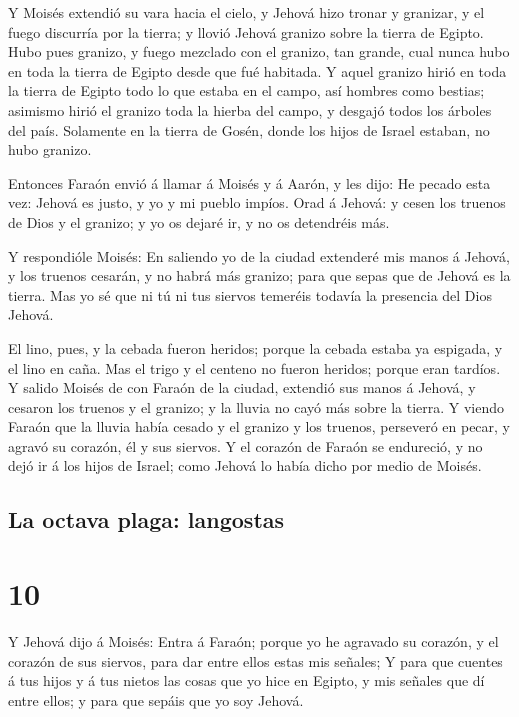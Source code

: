  Y Moisés extendió su vara hacia el cielo, y Jehová hizo
tronar y granizar, y el fuego discurría por la tierra; y llovió Jehová
granizo sobre la tierra de Egipto.  Hubo pues granizo, y
fuego mezclado con el granizo, tan grande, cual nunca hubo en toda la
tierra de Egipto desde que fué habitada.  Y aquel granizo
hirió en toda la tierra de Egipto todo lo que estaba en el campo, así
hombres como bestias; asimismo hirió el granizo toda la hierba del
campo, y desgajó todos los árboles del país.  Solamente
en la tierra de Gosén, donde los hijos de Israel estaban, no hubo
granizo.

 Entonces Faraón envió á llamar á Moisés y á Aarón, y les
dijo: He pecado esta vez: Jehová es justo, y yo y mi pueblo impíos.
 Orad á Jehová: y cesen los truenos de Dios y el granizo;
y yo os dejaré ir, y no os detendréis más.

 Y respondióle Moisés: En saliendo yo de la ciudad
extenderé mis manos á Jehová, y los truenos cesarán, y no habrá más
granizo; para que sepas que de Jehová es la tierra.  Mas
yo sé que ni tú ni tus siervos temeréis todavía la presencia del Dios
Jehová.

 El lino, pues, y la cebada fueron heridos; porque la
cebada estaba ya espigada, y el lino en caña.  Mas el
trigo y el centeno no fueron heridos; porque eran tardíos.
 Y salido Moisés de con Faraón de la ciudad, extendió sus
manos á Jehová, y cesaron los truenos y el granizo; y la lluvia no cayó
más sobre la tierra.  Y viendo Faraón que la lluvia había
cesado y el granizo y los truenos, perseveró en pecar, y agravó su
corazón, él y sus siervos.  Y el corazón de Faraón se
endureció, y no dejó ir á los hijos de Israel; como Jehová lo había
dicho por medio de Moisés.

\hypertarget{la-octava-plaga-langostas}{%
\subsection{La octava plaga:
langostas}\label{la-octava-plaga-langostas}}

\hypertarget{section-02-10}{%
\section{10}\label{section-02-10}}

 Y Jehová dijo á Moisés: Entra á Faraón; porque yo he
agravado su corazón, y el corazón de sus siervos, para dar entre ellos
estas mis señales;  Y para que cuentes á tus hijos y á tus
nietos las cosas que yo hice en Egipto, y mis señales que dí entre
ellos; y para que sepáis que yo soy Jehová.

